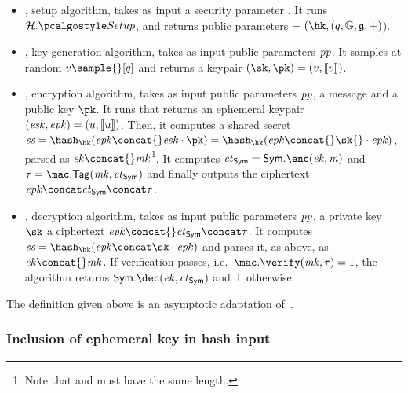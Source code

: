 \begin{itemize}
    \item \setup, setup algorithm, takes as input a security parameter \secparam{}. It runs $\hashSet.\hashSetup{}$, \groupSetup{} and returns public parameters \pparams{} = $(\hk,(q, \gset, \ggen, +)$).
    \item \kgen, key generation algorithm, takes as input public parameters $\mathit{pp}$. It samples at random $v \sample{} [q]$ and returns a keypair $(\sk, \pk) = (v, \groupenc{v})$.
    \item \enc, encryption algorithm, takes as input public parameters $\mathit{pp}$, a message \msg{} and a public key $\pk$. It runs \kgen{} that returns an ephemeral keypair $(\mathit{esk}, \mathit{epk}) = (u, \llbracket {u} \rrbracket)$. Then, it computes a shared secret $\sharedSecret = \hash_{\hk} (\epk \concat{} \esk{} \cdot \pk) = \hash_{\hk} (\epk \concat{} \sk{} \cdot \epk)$, parsed as $\ek{} \concat{} \mk{}$\footnote{Note that \ek{} and \mk{} must have the same length.}. It computes $\ct_{\sym} = \sym.\enc(\ek, \msg)$ and $\tau = \mac.\tagg(\mk, \ct_{\sym})$ and finally outputs the ciphertext $\epk \concat \ct_{\sym} \concat \tau$.
    \item \dec, decryption algorithm, takes as input public parameters $\mathit{pp}$, a private key $\sk$ a ciphertext $\epk \concat{} \ct_{\sym} \concat \tau$. It computes $\sharedSecret = \hash_{\hk} (\epk \concat \sk \cdot \epk)$ and parses it, as above, as $\ek \concat{} \mk$. If \mac{} verification passes, i.e.~$\mac.\verify(\mk, \tau) = 1$, the algorithm returns $\sym.\dec(\ek, \ct_{\sym})$ and $\bot{}$ otherwise.
\end{itemize}

The \dhaes{} definition given above is an asymptotic adaptation of~\cite[Section 1.3]{abdalla1999dhaes}.

\subsubsection{Inclusion of ephemeral key in hash input}\label{instantiation:enc:dhaes:eph-key}

